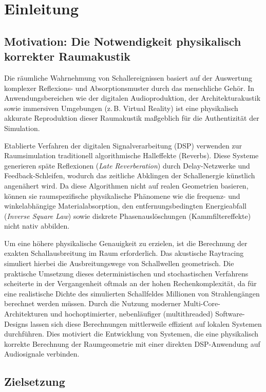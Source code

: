 \section{Einleitung}
\label{sec:einleitung}

\subsection{Motivation: Die Notwendigkeit physikalisch korrekter Raumakustik}
\label{subsec:motivation}

Die räumliche Wahrnehmung von Schallereignissen basiert auf der Auswertung komplexer Reflexions- und Absorptionsmuster durch das menschliche Gehör.
In Anwendungsbereichen wie der digitalen Audioproduktion,
der Architekturakustik sowie immersiven Umgebungen (z.\,B. Virtual Reality) ist eine physikalisch akkurate Reproduktion dieser Raumakustik maßgeblich für die Authentizität der Simulation.

Etablierte Verfahren der digitalen Signalverarbeitung (DSP) verwenden zur Raumsimulation traditionell algorithmische Halleffekte (Reverbs).
Diese Systeme generieren späte Reflexionen (\textit{Late Reverberation}) durch Delay-Netzwerke und Feedback-Schleifen, wodurch das zeitliche Abklingen der Schallenergie künstlich angenähert wird.
Da diese Algorithmen nicht auf realen Geometrien basieren, können sie raumspezifische physikalische Phänomene wie die frequenz- und winkelabhängige Materialabsorption,
den entfernungsbedingten Energieabfall (\textit{Inverse Square Law}) sowie diskrete Phasenauslöschungen (Kammfiltereffekte) nicht nativ abbilden.

Um eine höhere physikalische Genauigkeit zu erzielen, ist die Berechnung der exakten Schallausbreitung im Raum erforderlich.
Das akustische Raytracing simuliert hierbei die Ausbreitungswege von Schallwellen geometrisch.
Die praktische Umsetzung dieses deterministischen und stochastischen Verfahrens scheiterte in der Vergangenheit oftmals an der hohen Rechenkomplexität,
da für eine realistische Dichte des simulierten Schallfeldes Millionen von Strahlengängen berechnet werden müssen.
Durch die Nutzung moderner Multi-Core-Architekturen und hochoptimierter, nebenläufiger (multithreaded) Software-Designs lassen sich diese Berechnungen mittlerweile effizient auf lokalen Systemen durchführen.
Dies motiviert die Entwicklung von Systemen, die eine physikalisch korrekte Berechnung der Raumgeometrie mit einer direkten DSP-Anwendung auf Audiosignale verbinden.

\subsection{Zielsetzung}
\label{subsec:zielsetzung}

